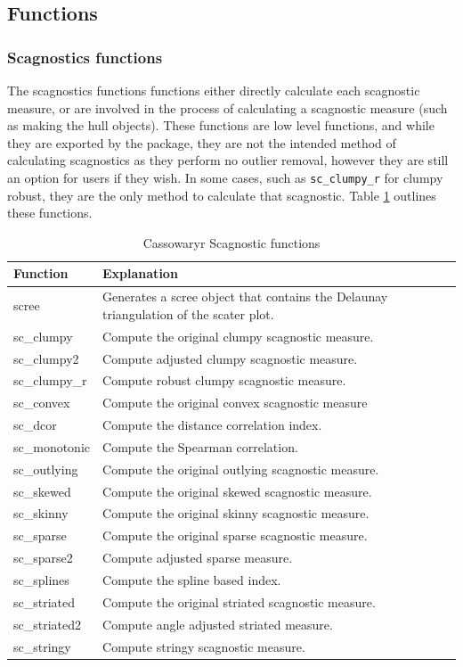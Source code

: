 \subsection{Functions}\label{functions}

\subsubsection{Scagnostics functions}\label{scagnostics-functions}

The scagnostics functions functions either directly calculate each scagnostic measure, or are involved in the process of calculating a scagnostic measure (such as making the hull objects). These functions are low level functions, and while they are exported by the package, they are not the intended method of calculating scagnostics as they perform no outlier removal, however they are still an option for users if they wish. In some cases, such as \texttt{sc\_clumpy\_r} for clumpy robust, they are the only method to calculate that scagnostic. Table \ref{tab:scagfuncs-tb-pdf} outlines these functions.

\begin{table}

\caption{\label{tab:scagfuncs-tb-pdf}Cassowaryr Scagnostic functions}
\centering
\begin{tabular}[t]{>{\raggedright\arraybackslash}p{3cm}>{\raggedright\arraybackslash}p{10cm}}
\toprule
Function & Explanation\\
\midrule
scree & Generates a scree object that contains the Delaunay triangulation of the scater plot.\\
sc\_clumpy & Compute the original clumpy scagnostic measure.\\
sc\_clumpy2 & Compute adjusted clumpy scagnostic measure.\\
sc\_clumpy\_r & Compute robust clumpy scagnostic measure.\\
sc\_convex & Compute the original convex scagnostic measure\\
\addlinespace
sc\_dcor & Compute the distance correlation index.\\
sc\_monotonic & Compute the Spearman correlation.\\
sc\_outlying & Compute the original outlying scagnostic measure.\\
sc\_skewed & Compute the original skewed scagnostic measure.\\
sc\_skinny & Compute the original skinny scagnostic measure.\\
\addlinespace
sc\_sparse & Compute the original sparse scagnostic measure.\\
sc\_sparse2 & Compute adjusted sparse measure.\\
sc\_splines & Compute the spline based index.\\
sc\_striated & Compute the original striated scagnostic measure.\\
sc\_striated2 & Compute angle adjusted striated measure.\\
\addlinespace
sc\_stringy & Compute stringy scagnostic measure.\\
\bottomrule
\end{tabular}
\end{table}

